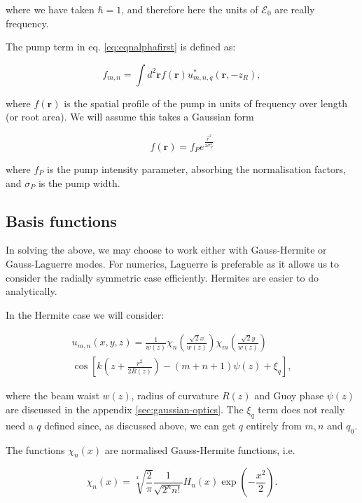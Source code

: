 \documentclass[a4paper,twocolumn,nobalancelastpage]{revtex4-1}
\newcommand{\vect}[1]{\mathbf{#1}}
\begin{document}
where we have taken $\hbar=1$, and therefore here the units of $\mathcal{E}_0$ are really frequency. 

The pump term in eq. \ref{eq:eqnalphafirst} is defined as:

\begin{equation}
\label{eq:pumptermdef}
  f_{m,n} = \int d^2\vect{r} f(\vect{r}) u^\ast_{m,n,q}(\vect{r}, - z_R),
\end{equation}

where $f(\vect{r})$ is the spatial profile of the pump in units of frequency over length (or root area). We will assume this takes a Gaussian form

\begin{displaymath}
\label{eq:gaussianpump}
f(\vect{r})=f_P e^{\frac{\vec{r}^2}{2 \sigma_P^2}}
\end{displaymath}

where $f_P$ is the pump intensity parameter, absorbing the normalisation factors, and $\sigma_P$ is the pump width.

\subsection{Basis functions}
\label{sec:basisfunction}

In solving the above, we may choose to work either with Gauss-Hermite or Gauss-Laguerre modes.  For numerics, Laguerre is preferable as it allows us to consider the radially symmetric case efficiently. Hermites are easier to do analytically.

In the Hermite case we will consider:

\begin{multline}
  u_{m,n}(x,y,z) = 
  \frac{1}{w(z)}
  \chi_n\left( \frac{\sqrt{2} x}{w(z)} \right)
  \chi_m\left( \frac{\sqrt{2} y}{w(z)} \right)
  \\
  \cos \left[
    k \left( z + \frac{r^2}{2R(z)} \right) - (m+n+1) \psi(z) + \xi_{q} \right],
\end{multline}

where the beam waist $w(z)$, radius of curvature $R(z)$ and Guoy phase $\psi(z)$ are discussed in the appendix \ref{sec:gaussian-optics}. The $\xi_q$ term does not really need a $q$ defined since, as discussed above, we can get $q$ entirely from $m, n$ and $q_0$.

The functions $\chi_n(x)$ are normalised Gauss-Hermite functions, i.e.

\begin{displaymath}
  \chi_n(x) = \sqrt[4]{\frac{2}{\pi}}
  \frac{1}{\sqrt{2^n n!}} H_n(x) \exp\left(-\frac{x^2}{2} \right).
\end{displaymath}
\end{document}
